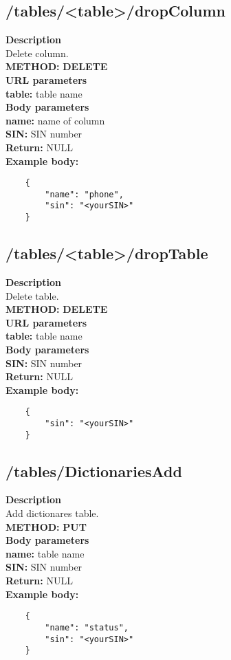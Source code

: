 \documentclass[a4paper, 12pt]{report}
\begin{document}
\subsection{/tables/<table>/dropColumn}
\textbf{\color{redText} Description} \\
Delete column. \\
\textbf{\color{redText} METHOD: } \textbf{DELETE} \\
\textbf{\color{redText} URL parameters} \\
\textbf{table: } table name\\
\textbf{\color{redText} Body parameters} \\
\textbf{name: } name of column\\
\textbf{SIN: } SIN number\\
\textbf{\color{redText} Return: } NULL\\
\textbf{\color{redText} Example body: }
\begin{lstlisting}
    {
        "name": "phone",
        "sin": "<yourSIN>"
    }
\end{lstlisting}

\subsection{/tables/<table>/dropTable}
\textbf{\color{redText} Description} \\
Delete table. \\
\textbf{\color{redText} METHOD: } \textbf{DELETE} \\
\textbf{\color{redText} URL parameters} \\
\textbf{table: } table name\\
\textbf{\color{redText} Body parameters} \\
\textbf{SIN: } SIN number\\
\textbf{\color{redText} Return: } NULL\\
\textbf{\color{redText} Example body: }
\begin{lstlisting}
    {
        "sin": "<yourSIN>"
    }
\end{lstlisting}

\subsection{/tables/DictionariesAdd}
\textbf{\color{redText} Description} \\
Add dictionares table. \\
\textbf{\color{redText} METHOD: } \textbf{PUT} \\
\textbf{\color{redText} Body parameters} \\
\textbf{name: } table name\\
\textbf{SIN: } SIN number\\
\textbf{\color{redText} Return: } NULL\\
\textbf{\color{redText} Example body: }
\begin{lstlisting}
    {
        "name": "status",
        "sin": "<yourSIN>"
    }
\end{lstlisting}
\end{document}
